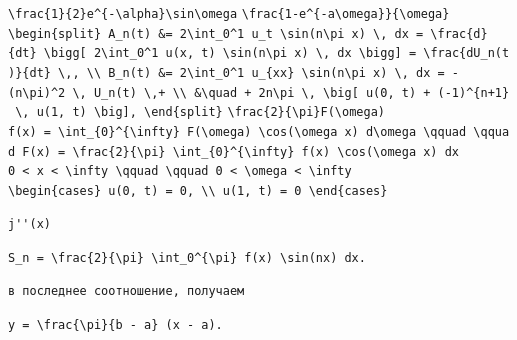 \documentclass[
  ukrainian,
]{article}
\begin{document}
\texttt{\textbackslash{}frac\{1\}\{2\}e\^{}\{-\textbackslash{}alpha\}\textbackslash{}sin\textbackslash{}omega}
\texttt{\textbackslash{}frac\{1-e\^{}\{-a\textbackslash{}omega\}\}\{\textbackslash{}omega\}}
\texttt{\textbackslash{}begin\{split\}\ A\_n(t)\ \&=\ 2\textbackslash{}int\_0\^{}1\ u\_t\ \textbackslash{}sin(n\textbackslash{}pi\ x)\ \textbackslash{},\ dx\ =\ \textbackslash{}frac\{d\}\{dt\}\ \textbackslash{}bigg{[}\ 2\textbackslash{}int\_0\^{}1\ u(x,\ t)\ \textbackslash{}sin(n\textbackslash{}pi\ x)\ \textbackslash{},\ dx\ \textbackslash{}bigg{]}\ =\ \textbackslash{}frac\{dU\_n(t)\}\{dt\}\ \textbackslash{},,\ \textbackslash{}\textbackslash{}\ B\_n(t)\ \&=\ 2\textbackslash{}int\_0\^{}1\ u\_\{xx\}\ \textbackslash{}sin(n\textbackslash{}pi\ x)\ \textbackslash{},\ dx\ =\ -(n\textbackslash{}pi)\^{}2\ \textbackslash{},\ U\_n(t)\ \textbackslash{},+\ \textbackslash{}\textbackslash{}\ \&\textbackslash{}quad\ +\ 2n\textbackslash{}pi\ \textbackslash{},\ \textbackslash{}big{[}\ u(0,\ t)\ +\ (-1)\^{}\{n+1\}\ \textbackslash{},\ u(1,\ t)\ \textbackslash{}big{]},\ \textbackslash{}end\{split\}}
\texttt{\textbackslash{}frac\{2\}\{\textbackslash{}pi\}F\textquotesingle{}\textquotesingle{}(\textbackslash{}omega)}
\texttt{f(x)\ =\ \textbackslash{}int\_\{0\}\^{}\{\textbackslash{}infty\}\ F(\textbackslash{}omega)\ \textbackslash{}cos(\textbackslash{}omega\ x)\ d\textbackslash{}omega\ \textbackslash{}qquad\ \textbackslash{}qquad\ F(x)\ =\ \textbackslash{}frac\{2\}\{\textbackslash{}pi\}\ \textbackslash{}int\_\{0\}\^{}\{\textbackslash{}infty\}\ f(x)\ \textbackslash{}cos(\textbackslash{}omega\ x)\ dx}
\texttt{0\ \textless{}\ x\ \textless{}\ \textbackslash{}infty\ \textbackslash{}qquad\ \textbackslash{}qquad\ 0\ \textless{}\ \textbackslash{}omega\ \textless{}\ \textbackslash{}infty}
\texttt{\textbackslash{}begin\{cases\}\ u(0,\ t)\ =\ 0,\ \textbackslash{}\textbackslash{}\ u(1,\ t)\ =\ 0\ \textbackslash{}end\{cases\}}

\begin{verbatim}
j''(x)
\end{verbatim}

\texttt{S\_n\ =\ \textbackslash{}frac\{2\}\{\textbackslash{}pi\}\ \textbackslash{}int\_0\^{}\{\textbackslash{}pi\}\ f(x)\ \textbackslash{}sin(nx)\ dx.}

\begin{verbatim}
в последнее соотношение, получаем
\end{verbatim}

\texttt{y\ =\ \textbackslash{}frac\{\textbackslash{}pi\}\{b\ -\ a\}\ (x\ -\ a).}
\end{document}
